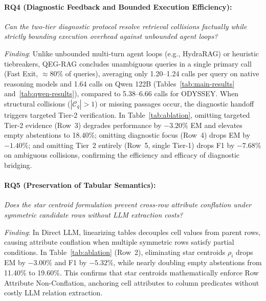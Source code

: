 \documentclass[runningheads]{llncs}
\begin{document}
\paragraph{RQ4 (Diagnostic Feedback and Bounded Execution Efficiency):}
\emph{Can the two-tier diagnostic protocol resolve retrieval collisions factually while strictly bounding execution overhead against unbounded agent loops?}

\emph{Finding}: Unlike unbounded multi-turn agent loops (e.g., HydraRAG) or heuristic tiebreakers, QEG-RAG concludes unambiguous queries in a single primary call (Fast Exit, $\approx 80\%$ of queries), averaging only 1.20--1.24 calls per query on native reasoning models and 1.64 calls on Qwen 122B (Tables~\ref{tab:main-results} and~\ref{tab:qwen-results}), compared to 5.38--6.66 calls for ODYSSEY. When structural collisions ($|\mathcal{C}_q| > 1$) or missing passages occur, the diagnostic handoff triggers targeted Tier-2 verification. In Table~\ref{tab:ablation}, omitting targeted Tier-2 evidence (Row~3) degrades performance by $-3.20\%$ EM and elevates empty abstentions to 18.40\%; omitting diagnostic focus (Row~4) drops EM by $-1.40\%$; and omitting Tier~2 entirely (Row~5, single Tier-1) drops F1 by $-7.68\%$ on ambiguous collisions, confirming the efficiency and efficacy of diagnostic bridging.

\paragraph{RQ5 (Preservation of Tabular Semantics):}
\emph{Does the star centroid formulation prevent cross-row attribute conflation under symmetric candidate rows without LLM extraction costs?}

\emph{Finding}: In Direct LLM, linearizing tables decouples cell values from parent rows, causing attribute conflation when multiple symmetric rows satisfy partial conditions. In Table~\ref{tab:ablation} (Row~2), eliminating star centroids $\rho_i$ drops EM by $-3.00\%$ and F1 by $-5.32\%$, while nearly doubling empty abstentions from 11.40\% to 19.60\%. This confirms that star centroids mathematically enforce Row Attribute Non-Conflation, anchoring cell attributes to column predicates without costly LLM relation extraction.
\end{document}
